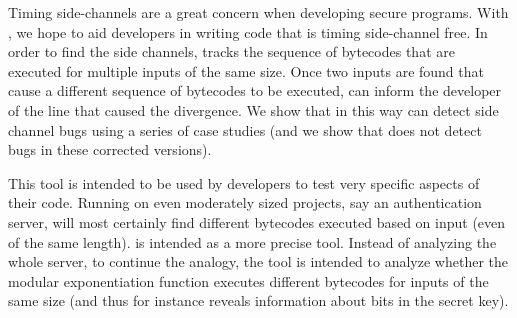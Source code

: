 Timing side-channels are a great concern when developing 
secure programs. With \jcupid, we hope to aid developers in writing
code that is timing side-channel free. In order to find the side
channels, \jcupid 
tracks the sequence of bytecodes that are executed for multiple inputs
of the same size. Once two inputs are found that cause a different
sequence of bytecodes to be executed, \jcupid can inform the developer
of the line that caused the
divergence. We show that in this way \jcupid can detect side channel
bugs using a series of case studies (and we show that \jcupid does not
detect bugs in these corrected versions).

This tool is intended to be used by developers to test very
specific aspects of their code. Running \jcupid on even moderately sized
projects, say an authentication server, will most
certainly find different bytecodes executed based on input (even of
the same length). \jcupid is intended as a more precise tool. Instead of 
analyzing the whole server, to continue the analogy, the tool is
intended to analyze whether the modular exponentiation function
executes different bytecodes for inputs of the same size (and thus for
instance reveals information about bits in the secret key). 
